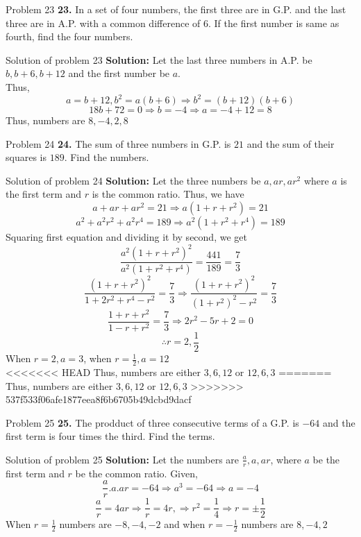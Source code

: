 \documentclass[aspectratio=1610,8pt]{beamer}
\begin{document}
\begin{frame}{Problem 23}
  \textbf{23.} In a set of four numbers, the first three are in G.P. and the
  last three are in A.P. with a common difference of $6$. If the first number
  is same as fourth, find the four numbers.
\end{frame}
\begin{frame}{Solution of problem 23}
  \textbf{Solution:} Let the last three numbers in A.P. be $b, b+6, b+12$ and
  the first number be $a$.\\
  Thus, $$a = b + 12, b^2 = a(b + 6) \Rightarrow b^2 = (b + 12)(b + 6)$$
  $$18b + 72 = 0 \Rightarrow b = -4 \Rightarrow a = -4 + 12 = 8$$
  Thus, numbers are $8, -4, 2, 8$
\end{frame}
\begin{frame}{Problem 24}
  \textbf{24.} The sum of three numbers in G.P. is $21$ and the sum of their
  squares is $189$. Find the numbers.
\end{frame}
\begin{frame}{Solution of problem 24}
  \textbf{Solution:} Let the three numbers be $a, ar, ar^2$ where $a$ is the
  first term and $r$ is the common ratio. Thus, we have
  $$a + ar + ar^2 = 21 \Rightarrow a(1 + r + r^2) = 21$$
  $$a^2 + a^2r^2 + a^2r^4 = 189 \Rightarrow a^2(1 + r^2 + r^4) = 189$$
  Squaring first equation and dividing it by second, we get
  $$\frac{a^2(1 + r + r^2)^2}{a^2(1 + r^2 + r^4)} = \frac{441}{189} =
  \frac{7}{3}$$
  $$\frac{(1 + r + r^2)^2}{1 + 2r^2 + r^4 - r^2} = \frac{7}{3} \Rightarrow
  \frac{(1 + r + r^2)^2}{(1 + r^2)^2 - r^2} = \frac{7}{3}$$
  $$\frac{1 + r + r^2}{1 -r + r^2} = \frac{7}{3} \Rightarrow 2r^2 - 5r + 2 =
  0$$
  $$\therefore r = 2, \frac{1}{2}$$
  When $r = 2, a = 3$, when $r = \frac{1}{2}, a = 12$\\
<<<<<<< HEAD
  Thus, numbers are either $3, 6, 12$ or $12, 6, 3$
=======
  Thus, numbers are either $3, 6, 12$ or $12, 6, 3$
>>>>>>> 537f533f06afe1877eea8f6b6705b49dcbd9dacf
\end{frame}
\begin{frame}{Problem 25}
  \textbf{25.} The prodduct of three consecutive terms of a G.P. is $-64$ and
  the first term is four times the third. Find the terms.
\end{frame}
\begin{frame}{Solution of problem 25}
  \textbf{Solution:} Let the numbers are $\frac{a}{r}, a, ar$, where $a$ be the
  first term and $r$ be the common ratio. Given,
  $$\frac{a}{r}.a.ar = -64 \Rightarrow a^3 = -64 \Rightarrow a = -4$$
  $$\frac{a}{r} = 4ar \Rightarrow \frac{1}{r} = 4r, \Rightarrow r^2 =
  \frac{1}{4} \Rightarrow r = \pm \frac{1}{2}$$
  When $r = \frac{1}{2}$ numbers are $-8, -4, -2$ and when $r = -\frac{1}{2}$
  numbers are $8, -4, 2$
\end{frame}
\end{document}
